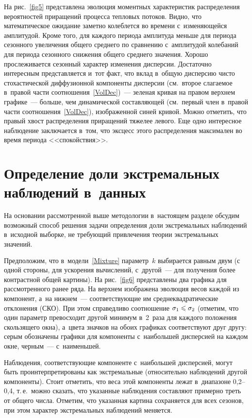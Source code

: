 \begin{multicols}{2}
На рис.~\ref{fig5} представлена эволюция моментных характеристик
распределения вероятностей приращений процесса тепловых потоков.
Видно, что математическое ожидание заметно колеблется во
времени с~изменяющейся амплитудой. Кроме того, для каждого
периода амплитуда меньше для периода сезонного увеличения
общего среднего по сравнению с~амплитудой колебаний для периода
сезонного снижения общего среднего значения. Хорошо
прослеживается сезонный характер изменения дисперсии.
Достаточно интересным представляется и~тот факт, что
вклад в~общую дис\-пер\-сию чисто стохастической диффузионной
компоненты дис\-пер\-сии (см.\ второе слагаемое в~правой части
соотношения~\eqref{VolDec})~--- зеленая кривая на правом верхнем
графике~---  больше, чем динамической составляющей (см.\ первый
член в~правой части соотношения~\eqref{VolDec}), изображенной
синей кривой. Можно отметить, что правый хвост распределения
приращений тяжелее левого. Еще одно интересное наблюдение
заключается в~том, что эксцесс этого распределения максимален во
время периода <<спокой\-ствия>>.
{

}


\section{Определение доли экстремальных наблюдений в~данных}

На основании рассмотренной выше методологии в~настоящем
разделе обсудим возможный способ решения задачи определения
доли экстремальных наблюдений в~исходной выборке, не
\mbox{тре\-бу\-ющий} привлечения теории экстремальных значений.

Предположим, что в~модели~\eqref{Mixture} параметр~$k$ выбирается
равным двум (с одной стороны, для ускорения вычислений, с~другой~---  
для получения более контрастной общей картины). На
рис.~\ref{fig6} пред\-став\-ле\-ны два графика для рассмотренного ранее
ряда. На верхнем изображена эволюция весов каждой из компонент, 
а~на нижнем~--- соответствующие им среднеквадратические отклонения (СКО).
При этом справедливо соотношение $\sigma_1\hm\leqslant\sigma_2$
(отметим, что один параметр превосходит другой минимум в~2~раза
для каждого положения скользящего окна), а~цвета значков на обоих
графиках соответствуют друг другу: серым обозначены графики для
компоненты с~наибольшей дисперсией на каждом окне, черным~--- 
с~наименьшей.



Наблюдения, соответствующие компоненте с~наибольшей
дисперсией, могут быть проинтерпретированы как
экстремальные (относительно наблюдений другой компоненты).
Стоит отметить, что веса этой компоненты лежат в~диапазоне
0,2--0,4, т.\,е.\ можно сказать, что указанные наблюдения
составляют примерно треть от общего числа. Отметим, что указанная
картина сохраняется для всех сезонов, при этом характер
экстремальных наблюдений меняется.


\end{multicols}
